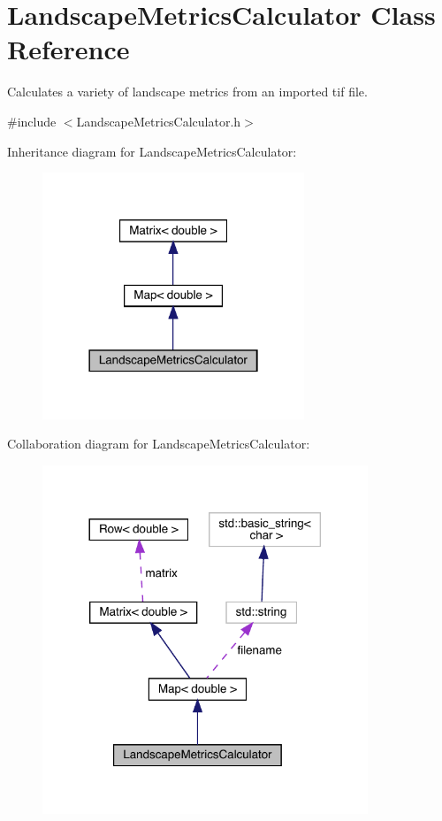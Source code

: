 \hypertarget{class_landscape_metrics_calculator}{}\section{Landscape\+Metrics\+Calculator Class Reference}
\label{class_landscape_metrics_calculator}


Calculates a variety of landscape metrics from an imported tif file.  




{\ttfamily \#include $<$Landscape\+Metrics\+Calculator.\+h$>$}



Inheritance diagram for Landscape\+Metrics\+Calculator\+:\nopagebreak
\begin{figure}[H]
\begin{center}
\leavevmode
\includegraphics[width=222pt]{class_landscape_metrics_calculator__inherit__graph}
\end{center}
\end{figure}


Collaboration diagram for Landscape\+Metrics\+Calculator\+:\nopagebreak
\begin{figure}[H]
\begin{center}
\leavevmode
\includegraphics[width=276pt]{class_landscape_metrics_calculator__coll__graph}
\end{center}
\end{figure}
